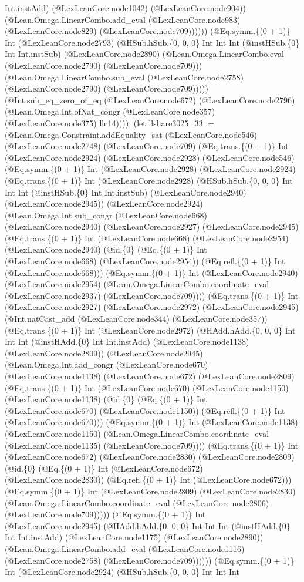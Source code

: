 \documentclass[11pt]{article}
\begin{document}
Int.instAdd) (@LexLeanCore.node1042) (@LexLeanCore.node904)) (@Lean.Omega.LinearCombo.add\_eval (@LexLeanCore.node983) (@LexLeanCore.node829) (@LexLeanCore.node709)))))) (@Eq.symm.\{(0 + 1)\} Int (@LexLeanCore.node2793) (@HSub.hSub.\{0, 0, 0\} Int Int Int (@instHSub.\{0\} Int Int.instSub) (@LexLeanCore.node2890) (@Lean.Omega.LinearCombo.eval (@LexLeanCore.node2790) (@LexLeanCore.node709))) (@Lean.Omega.LinearCombo.sub\_eval (@LexLeanCore.node2758) (@LexLeanCore.node2790) (@LexLeanCore.node709))))) (@Int.sub\_eq\_zero\_of\_eq (@LexLeanCore.node672) (@LexLeanCore.node2796) (@Lean.Omega.Int.ofNat\_congr (@LexLeanCore.node357) (@LexLeanCore.node375) llc14)))); (let llshare3025\_33 := (@Lean.Omega.Constraint.addEquality\_sat (@LexLeanCore.node546) (@LexLeanCore.node2748) (@LexLeanCore.node709) (@Eq.trans.\{(0 + 1)\} Int (@LexLeanCore.node2924) (@LexLeanCore.node2928) (@LexLeanCore.node546) (@Eq.symm.\{(0 + 1)\} Int (@LexLeanCore.node2928) (@LexLeanCore.node2924) (@Eq.trans.\{(0 + 1)\} Int (@LexLeanCore.node2928) (@HSub.hSub.\{0, 0, 0\} Int Int Int (@instHSub.\{0\} Int Int.instSub) (@LexLeanCore.node2940) (@LexLeanCore.node2945)) (@LexLeanCore.node2924) (@Lean.Omega.Int.sub\_congr (@LexLeanCore.node668) (@LexLeanCore.node2940) (@LexLeanCore.node2927) (@LexLeanCore.node2945) (@Eq.trans.\{(0 + 1)\} Int (@LexLeanCore.node668) (@LexLeanCore.node2954) (@LexLeanCore.node2940) (@id.\{0\} (@Eq.\{(0 + 1)\} Int (@LexLeanCore.node668) (@LexLeanCore.node2954)) (@Eq.refl.\{(0 + 1)\} Int (@LexLeanCore.node668))) (@Eq.symm.\{(0 + 1)\} Int (@LexLeanCore.node2940) (@LexLeanCore.node2954) (@Lean.Omega.LinearCombo.coordinate\_eval (@LexLeanCore.node2937) (@LexLeanCore.node709)))) (@Eq.trans.\{(0 + 1)\} Int (@LexLeanCore.node2927) (@LexLeanCore.node2972) (@LexLeanCore.node2945) (@Int.natCast\_add (@LexLeanCore.node344) (@LexLeanCore.node357)) (@Eq.trans.\{(0 + 1)\} Int (@LexLeanCore.node2972) (@HAdd.hAdd.\{0, 0, 0\} Int Int Int (@instHAdd.\{0\} Int Int.instAdd) (@LexLeanCore.node1138) (@LexLeanCore.node2809)) (@LexLeanCore.node2945) (@Lean.Omega.Int.add\_congr (@LexLeanCore.node670) (@LexLeanCore.node1138) (@LexLeanCore.node672) (@LexLeanCore.node2809) (@Eq.trans.\{(0 + 1)\} Int (@LexLeanCore.node670) (@LexLeanCore.node1150) (@LexLeanCore.node1138) (@id.\{0\} (@Eq.\{(0 + 1)\} Int (@LexLeanCore.node670) (@LexLeanCore.node1150)) (@Eq.refl.\{(0 + 1)\} Int (@LexLeanCore.node670))) (@Eq.symm.\{(0 + 1)\} Int (@LexLeanCore.node1138) (@LexLeanCore.node1150) (@Lean.Omega.LinearCombo.coordinate\_eval (@LexLeanCore.node1135) (@LexLeanCore.node709)))) (@Eq.trans.\{(0 + 1)\} Int (@LexLeanCore.node672) (@LexLeanCore.node2830) (@LexLeanCore.node2809) (@id.\{0\} (@Eq.\{(0 + 1)\} Int (@LexLeanCore.node672) (@LexLeanCore.node2830)) (@Eq.refl.\{(0 + 1)\} Int (@LexLeanCore.node672))) (@Eq.symm.\{(0 + 1)\} Int (@LexLeanCore.node2809) (@LexLeanCore.node2830) (@Lean.Omega.LinearCombo.coordinate\_eval (@LexLeanCore.node2806) (@LexLeanCore.node709))))) (@Eq.symm.\{(0 + 1)\} Int (@LexLeanCore.node2945) (@HAdd.hAdd.\{0, 0, 0\} Int Int Int (@instHAdd.\{0\} Int Int.instAdd) (@LexLeanCore.node1175) (@LexLeanCore.node2890)) (@Lean.Omega.LinearCombo.add\_eval (@LexLeanCore.node1116) (@LexLeanCore.node2758) (@LexLeanCore.node709)))))) (@Eq.symm.\{(0 + 1)\} Int (@LexLeanCore.node2924) (@HSub.hSub.\{0, 0, 0\} Int Int Int 
\end{document}

